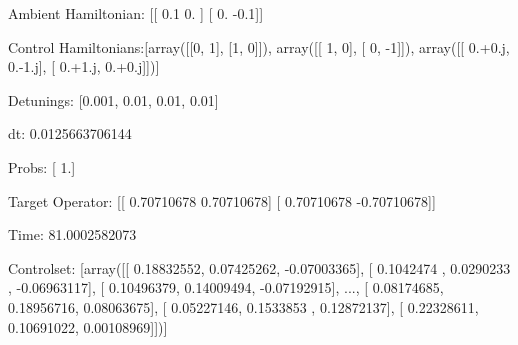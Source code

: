 \documentclass{article}
\begin{document}
    

\newpage

Ambient Hamiltonian: [[ 0.1  0. ]
 [ 0.  -0.1]]

Control Hamiltonians:[array([[0, 1],
       [1, 0]]), array([[ 1,  0],
       [ 0, -1]]), array([[ 0.+0.j,  0.-1.j],
       [ 0.+1.j,  0.+0.j]])]

Detunings: [0.001, 0.01, 0.01, 0.01]

 dt: 0.0125663706144

Probs: [ 1.]

Target Operator: [[ 0.70710678  0.70710678]
 [ 0.70710678 -0.70710678]]

Time: 81.0002582073

Controlset: [array([[ 0.18832552,  0.07425262, -0.07003365],
       [ 0.1042474 ,  0.0290233 , -0.06963117],
       [ 0.10496379,  0.14009494, -0.07192915],
       ..., 
       [ 0.08174685,  0.18956716,  0.08063675],
       [ 0.05227146,  0.1533853 ,  0.12872137],
       [ 0.22328611,  0.10691022,  0.00108969]])]
\end{document}

